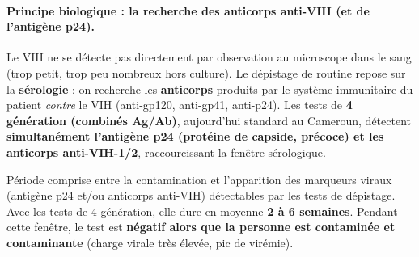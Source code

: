 \documentclass[11pt]{article}
\begin{document}
\paragraph{Principe biologique : la recherche des anticorps anti-VIH (et de l'antigène p24).}
Le VIH ne se détecte pas directement par observation au microscope dans le sang (trop petit, trop peu nombreux hors culture). Le dépistage de routine repose sur la \textbf{sérologie} : on recherche les \textbf{anticorps} produits par le système immunitaire du patient \emph{contre} le VIH (anti-gp120, anti-gp41, anti-p24). Les tests de \textbf{4 génération (combinés Ag/Ab)}, aujourd'hui standard au Cameroun, détectent \textbf{simultanément l'antigène p24 (protéine de capside, précoce) et les anticorps anti-VIH-1/2}, raccourcissant la fenêtre sérologique.

\begin{definition}
Période comprise entre la contamination et l'apparition des marqueurs viraux (antigène p24 et/ou anticorps anti-VIH) détectables par les tests de dépistage. Avec les tests de 4 génération, elle dure en moyenne \textbf{2 à 6 semaines}. Pendant cette fenêtre, le test est \textbf{négatif alors que la personne est contaminée et contaminante} (charge virale très élevée, pic de virémie).
\end{definition}
\end{document}
